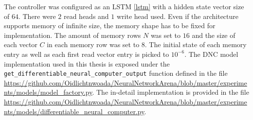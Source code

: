 \documentclass[draft,final]{vutinfth} %
\begin{document}
    The controller was configured as an LSTM \ref{lstm} with a hidden state vector size of $64$. There were $2$ read heads and $1$ write head used.
    Even if the architecture supports memory of infinite size, the memory shape has to be fixed for implementation.
    The amount of memory rows $N$ was set to $16$ and the size of each vector $C$ in each memory row was set to $8$.
    The initial state of each memory entry as well as each first read vector entry is picked to $10^{-6}$. 
    The DNC model implementation used in this thesis is exposed under the \texttt{get\_differentiable\_neural\_computer\_output} function defined in the file \url{https://github.com/Oidlichtnwoada/NeuralNetworkArena/blob/master/experiments/models/model_factory.py}.
    The in-detail implementation is provided in the file \url{https://github.com/Oidlichtnwoada/NeuralNetworkArena/blob/master/experiments/models/differentiable_neural_computer.py}.
\end{document}
